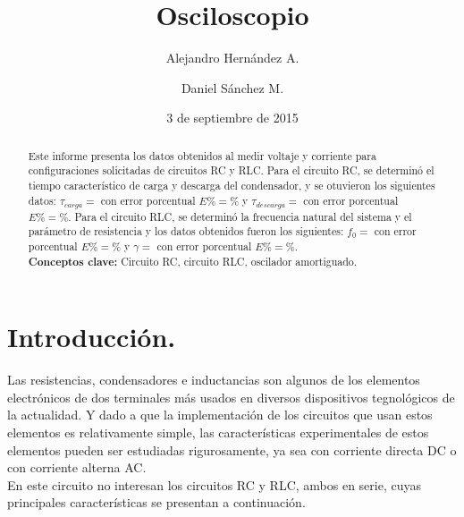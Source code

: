 \documentclass[prb,aps,twocolumn,preprintnumbers,amsmath,amssymb]{revtex4}
\begin{document}
\title{Osciloscopio}%

\author{Alejandro Hernández A.}%
\author{Daniel Sánchez M.}%
%
\date{3 de septiembre de 2015\\}%

\begin{abstract}
Este informe presenta los datos obtenidos al medir voltaje y corriente para configuraciones solicitadas de circuitos RC y RLC. Para el circuito RC, se determinó el tiempo característico de carga y descarga del condensador, y se otuvieron los siguientes datos: $\tau_{carga} = $ con error porcentual $E\% = \%$ y $\tau_{descarga} = $ con error porcentual $E\% = \%$. Para el circuito RLC, se determinó la frecuencia natural del sistema y el parámetro de resistencia y los datos obtenidos fueron los siguientes: $f_{0} = $ con error porcentual $E\% = \%$ y $\gamma = $ con error porcentual $E\% = \%$. 
\\

\noindent \textbf{Conceptos clave:} Circuito RC, circuito RLC, oscilador amortiguado.
\end{abstract}
                             
\maketitle

\section{\label{sec:level1}Introducción.}

Las resistencias, condensadores e inductancias son algunos de los elementos electrónicos de dos terminales más usados en diversos dispositivos tegnológicos de la actualidad. Y dado a que la implementación de los circuitos que usan estos elementos es relativamente simple, las características experimentales de estos elementos pueden ser estudiadas rigurosamente, ya sea con corriente directa DC o con corriente alterna AC.\\

En este circuito no interesan los circuitos RC y RLC, ambos en serie, cuyas principales características se presentan a continuación.
\end{document}
